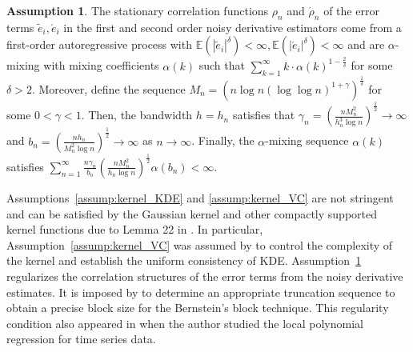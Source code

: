 \documentclass{uwstat572}
\theoremstyle{definition}
\newtheorem{assump}{Assumption}
\renewcommand{\tilde}{\widetilde}
\theoremstyle{theorem}
\begin{document}
\begin{assump}
\label{assump:mixing}
The stationary correlation functions $\rho_n$ and $\acute{\rho}_n$ of the error terms $\tilde{e}_i,\acute{e}_i$ in the first and second order noisy derivative estimators come from a first-order autoregressive process with $\mathbb{E}\left(|\tilde{e}_i|^{\delta}\right) <\infty, \mathbb{E}\left(|\acute{e}_i|^{\delta}\right) <\infty$ and are $\alpha$-mixing with mixing coefficients $\alpha(k)$ such that $\sum_{k=1}^{\infty} k \cdot \alpha(k)^{1-\frac{2}{\delta}}$ for some $\delta >2$. Moreover, define the sequence $M_n=\left(n\log n (\log\log n)^{1+\gamma}\right)^{\frac{1}{\delta}}$ for some $0<\gamma <1$. Then, the bandwidth $h=h_n$ satisfies that $\gamma_n=\left(\frac{nM_n^2}{h_n^3 \log n}\right)^{\frac{1}{2}} \to \infty$ and $b_n=\left(\frac{nh_n}{M_n^2 \log n}\right)^{\frac{1}{2}} \to \infty$ as $n\to\infty$. Finally, the $\alpha$-mixing sequence $\alpha(k)$ satisfies $\sum_{n=1}^{\infty} \frac{n\gamma_n}{b_n}\left(\frac{nM_n^2}{h_n\log n}\right)^{\frac{1}{2}} \alpha(b_n) <\infty$.
\end{assump}

Assumptions~\ref{assump:kernel_KDE} and \ref{assump:kernel_VC} are not stringent and can be satisfied by the Gaussian kernel and other compactly supported kernel functions due to Lemma 22 in \cite{nolan1987uprocesses}. In particular, Assumption~\ref{assump:kernel_VC} was assumed by \cite{gine2002rates,Einmahl2005uniform} to control the complexity of the kernel and establish the uniform consistency of KDE. Assumption~\ref{assump:mixing} regularizes the correlation structures of the error terms from the noisy derivative estimates. It is imposed by \cite{francisco2003uniform} to determine an appropriate truncation sequence to obtain a precise block size for the Bernstein's block technique. This regularity condition also appeared in \cite{masry1996multivariate} when the author studied the local polynomial regression for time series data. 
\end{document}
